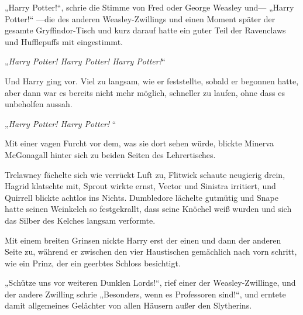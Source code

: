„Harry Potter!“, schrie die Stimme von Fred oder George Weasley und—
„Harry Potter!“ —die des anderen Weasley-Zwillings und einen Moment später der gesamte Gryffindor-Tisch und kurz darauf hatte ein guter Teil der Ravenclaws und Hufflepuffs mit eingestimmt.

„\emph{Harry Potter! Harry Potter! Harry Potter!}“

Und Harry ging vor. Viel zu langsam, wie er feststellte, sobald er begonnen hatte, aber dann war es bereits nicht mehr möglich, schneller zu laufen, ohne dass es unbeholfen aussah.

\later

„\emph{Harry Potter! Harry Potter! }“


Mit einer vagen Furcht vor dem, was sie dort sehen würde, blickte Minerva McGonagall hinter sich zu beiden Seiten des Lehrertisches.

Trelawney fächelte sich wie verrückt Luft zu, Flitwick schaute neugierig drein, Hagrid klatschte mit, Sprout wirkte ernst, Vector und Sinistra irritiert, und Quirrell blickte achtlos ins Nichts. Dumbledore lächelte gutmütig und Snape hatte seinen Weinkelch so festgekrallt, dass seine Knöchel weiß wurden und sich das Silber des Kelches langsam verformte.

Mit einem breiten Grinsen nickte Harry erst der einen und dann der anderen Seite zu, während er zwischen den vier Haustischen gemächlich nach vorn schritt, wie ein Prinz, der ein geerbtes Schloss besichtigt.

„Schütze uns vor weiteren Dunklen Lords!“, rief einer der Weasley-Zwillinge, und der andere Zwilling schrie
„Besonders, wenn es Professoren sind!“, und erntete damit allgemeines Gelächter von allen Häusern außer den Slytherins.

